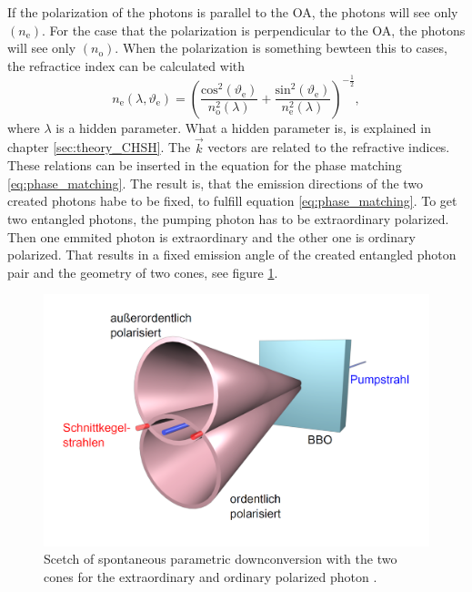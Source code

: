 If the polarization of the photons is parallel to the OA, the photons will see only $(n_{\mathrm{e}})$. 
For the case that the polarization is perpendicular to the OA, the photons will see only $(n_{\mathrm{o}})$. When the polarization is something bewteen this to cases, the refractice index can be calculated with
\begin{equation}
    n_{\mathrm{e}}(\lambda, \vartheta_{\mathrm{e}}) 
    = \left( 
    \frac{\mathrm{cos}^2(\vartheta_{\mathrm{e}})}{n_{\mathrm{o}}^2(\lambda)} 
    + \frac{\mathrm{sin}^2(\vartheta_{\mathrm{e}})}{n_{\mathrm{e}}^2(\lambda)}
    \right)^{-\frac{1}{2}},
\end{equation}
where $\lambda$ is a hidden parameter. What a hidden parameter is, is explained in chapter \ref{sec:theory_CHSH}.  
The $\vec{k}$ vectors are related to the refractive indices. These relations can be inserted in the equation for the phase matching \eqref{eq:phase_matching}. The result is, that the emission directions of the two created photons habe to be fixed, to fulfill equation \eqref{eq:phase_matching}. To get two entangled photons, the pumping photon has to be extraordinary polarized. Then one emmited photon is extraordinary and the other one is ordinary polarized. That results in a fixed emission angle of the created entangled photon pair and the geometry of two cones, see figure \ref{fig:theory_cones}. 
\begin{figure}[H]
\centering
\includegraphics[scale=0.2]{figures/2_kegel.PNG}
\caption{Scetch of spontaneous parametric downconversion with the two cones for the extraordinary and ordinary polarized photon \cite{barz}.   }
\label{fig:theory_cones}
\end{figure}


